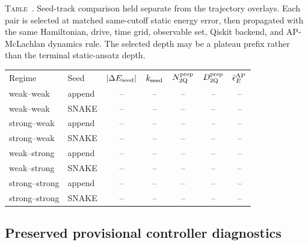 \documentclass[
  reprint,
  amsmath,
  amssymb,
  aps,
  pra,
  nofootinbib,
  superscriptaddress,
  floatfix
]{revtex4-2}
\newcommand{\tentative}[1]{\textcolor{red!70!black}{#1}}
\newcommand{\twq}{\mathrm{2Q}}
\newcommand{\inlinetablecaption}[2]{%
  \refstepcounter{table}\label{#1}%
  \noindent\textsc{Table~\thetable.} #2\par\vspace{0.6ex}%
}
\begin{document}
\noindent\begin{minipage}{\columnwidth}
\inlinetablecaption{tab:dyn_seed_track_comparison}{Seed-track comparison held separate from the trajectory overlays.  Each pair is selected at matched same-cutoff static energy error, then propagated with the same Hamiltonian, drive, time grid, observable set, Qiskit backend, and AP-McLachlan dynamics rule.  The selected depth may be a plateau prefix rather than the terminal static-ansatz depth.}
\begin{center}
\scriptsize
\setlength{\tabcolsep}{0.9pt}
\renewcommand{\arraystretch}{1.02}
\begin{ruledtabular}
\begin{tabular}{p{}p{}ccccc}
Regime & Seed & $|\Delta E_{\rm seed}|$ & $k_{\rm seed}$ & $N_{\twq}^{\rm prep}$ & $D_{\twq}^{\rm prep}$ & $\bar\epsilon_E^{\rm AP}$\\
\colrule
weak--weak & append & \tentative{--} & \tentative{--} & \tentative{--} & \tentative{--} & \tentative{--}\\
weak--weak & SNAKE & \tentative{--} & \tentative{--} & \tentative{--} & \tentative{--} & \tentative{--}\\
strong--weak & append & \tentative{--} & \tentative{--} & \tentative{--} & \tentative{--} & \tentative{--}\\
strong--weak & SNAKE & \tentative{--} & \tentative{--} & \tentative{--} & \tentative{--} & \tentative{--}\\
weak--strong & append & \tentative{--} & \tentative{--} & \tentative{--} & \tentative{--} & \tentative{--}\\
weak--strong & SNAKE & \tentative{--} & \tentative{--} & \tentative{--} & \tentative{--} & \tentative{--}\\
strong--strong & append & \tentative{--} & \tentative{--} & \tentative{--} & \tentative{--} & \tentative{--}\\
strong--strong & SNAKE & \tentative{--} & \tentative{--} & \tentative{--} & \tentative{--} & \tentative{--}\\
\end{tabular}
\end{ruledtabular}
\end{center}
\end{minipage}

\subsection{Preserved provisional controller diagnostics}
\end{document}
